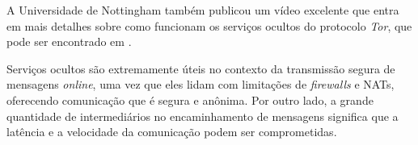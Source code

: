 A Universidade de Nottingham também publicou um vídeo excelente que entra em mais detalhes sobre como funcionam os serviços ocultos do protocolo \textit{Tor}, que pode ser encontrado em \cite{computerphile-hidden-services}.

Serviços ocultos são extremamente úteis no contexto da transmissão segura de mensagens \textit{online}, uma vez que eles lidam com limitações de \textit{firewalls} e NATs, oferecendo comunicação que é segura e anônima. Por outro lado, a grande quantidade de intermediários no encaminhamento de mensagens significa que a latência e a velocidade da comunicação podem ser comprometidas.
